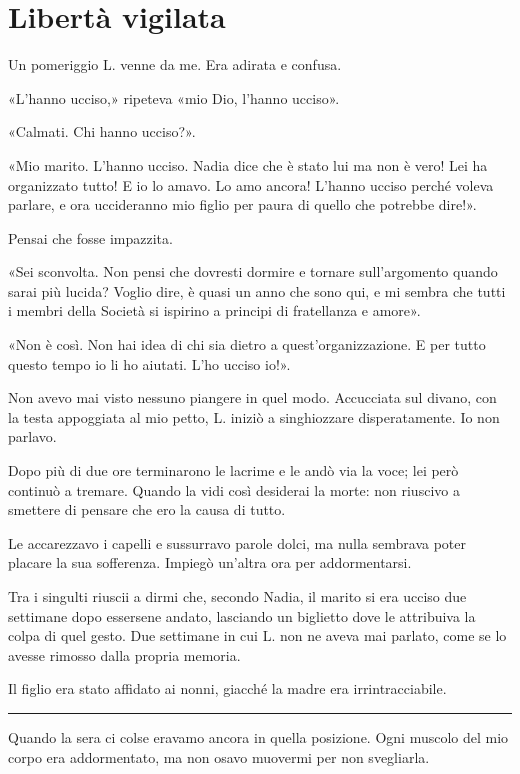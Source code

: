 \chapter{Libertà vigilata}
\label{ch:liberta-vigilata}

Un pomeriggio L. venne da me. Era adirata e confusa.

«L'hanno ucciso,» ripeteva «mio Dio, l'hanno ucciso».

«Calmati. Chi hanno ucciso?».

«Mio marito. L'hanno ucciso. Nadia dice che è stato lui ma non è vero! Lei ha organizzato tutto! E
io lo amavo. Lo amo ancora! L'hanno ucciso perché voleva parlare, e ora uccideranno mio figlio per
paura di quello che potrebbe dire!».

Pensai che fosse impazzita.

«Sei sconvolta. Non pensi che dovresti dormire e tornare sull'argomento quando sarai più lucida?
Voglio dire, è quasi un anno che sono qui, e mi sembra che tutti i membri della Società si ispirino
a principi di fratellanza e amore».

«Non è così. Non hai idea di chi sia dietro a quest'organizzazione. E per tutto questo tempo io li
ho aiutati. L'ho ucciso io!».

Non avevo mai visto nessuno piangere in quel modo. Accucciata sul divano, con la testa appoggiata al
mio petto, L. iniziò a singhiozzare disperatamente. Io non parlavo.

Dopo più di due ore terminarono le lacrime e le andò via la voce; lei però continuò a tremare.
Quando la vidi così desiderai la morte: non riuscivo a smettere di pensare che ero la causa di
tutto.

Le accarezzavo i capelli e sussurravo parole dolci, ma nulla sembrava poter placare la sua
sofferenza. Impiegò un'altra ora per addormentarsi.

Tra i singulti riuscii a dirmi che, secondo Nadia, il marito si era ucciso due settimane dopo
essersene andato, lasciando un biglietto dove le attribuiva la colpa di quel gesto. Due settimane in
cui L. non ne aveva mai parlato, come se lo avesse rimosso dalla propria memoria.

Il figlio era stato affidato ai nonni, giacché la madre era irrintracciabile.

\plainbreak{1}

Quando la sera ci colse eravamo ancora in quella posizione. Ogni muscolo del mio corpo era
addormentato, ma non osavo muovermi per non svegliarla.


